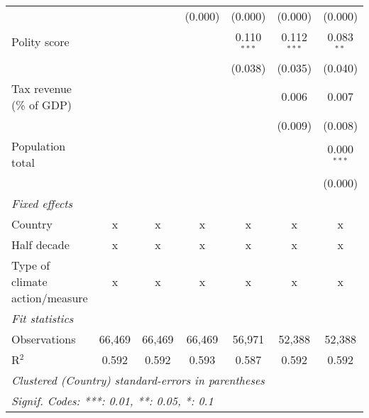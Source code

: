 \begin{tabular}{lcccccc}
                                                                          &               &                & (0.000)        & (0.000)        & (0.000)        & (0.000)\\   
   Polity score                                                           &               &                &                & 0.110$^{***}$  & 0.112$^{***}$  & 0.083$^{**}$\\   
                                                                          &               &                &                & (0.038)        & (0.035)        & (0.040)\\   
   Tax revenue (\% of GDP)                                                &               &                &                &                & 0.006          & 0.007\\   
                                                                          &               &                &                &                & (0.009)        & (0.008)\\   
   Population total                                                       &               &                &                &                &                & 0.000$^{***}$\\   
                                                                          &               &                &                &                &                & (0.000)\\   
   \emph{Fixed effects}\\
   Country                                                                & x             & x              & x              & x              & x              & x\\  
   Half decade                                                            & x             & x              & x              & x              & x              & x\\  
   Type of climate action/measure                                         & x             & x              & x              & x              & x              & x\\  
   \midrule \emph{Fit statistics}\\
   Observations                                                           & 66,469        & 66,469         & 66,469         & 56,971         & 52,388         & 52,388\\  
   R$^2$                                                                  & 0.592         & 0.592          & 0.593          & 0.587          & 0.592          & 0.592\\  
   \midrule
   \multicolumn{7}{l}{\emph{Clustered (Country) standard-errors in parentheses}}\\
   \multicolumn{7}{l}{\emph{Signif. Codes: ***: 0.01, **: 0.05, *: 0.1}}\\
\end{tabular}
\par\endgroup


